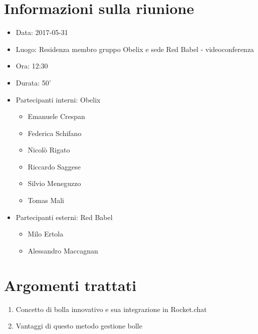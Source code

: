 \documentclass[10 pt,a4paper, openany]{article}
\date{}
\begin{document}
\paginatitolo
\section{Informazioni sulla riunione}

\begin{itemize}
\item[] Data: 2017-05-31
\item[] Luogo: Residenza membro gruppo Obelix e sede Red Babel - videoconferenza
\item[] Ora: 12:30
\item[] Durata: 50'
\item[] Partecipanti interni: Obelix
  \begin{itemize}
  \item[] Emanuele Crespan
  \item[] Federica Schifano
  \item[] Nicolò Rigato
  \item[] Riccardo Saggese
  \item[] Silvio Meneguzzo
  \item[] Tomas Mali
  \end{itemize}
\item[] Partecipanti esterni: Red Babel
  \begin{itemize}
  \item[] Milo Ertola
  \item[] Alessandro Maccagnan
  \end{itemize}
\end{itemize}

\section{Argomenti trattati}

\begin{enumerate}
	\item Concetto di bolla innovativo e sua integrazione in Rocket.chat
	\item Vantaggi di questo metodo gestione bolle
\end{enumerate}

	\clearpage
\end{document}
